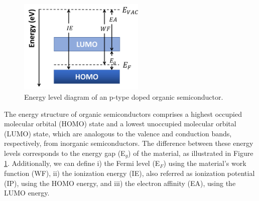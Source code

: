 \begin{figure}[h]
  \centering
  \includegraphics[width=6cm]{Images/pdf/ediagram.pdf}
  \caption[Energy level diagram of organic semiconductors]{Energy level diagram of an p-type doped organic semiconductor.}
  \label{fig:ediag}
\end{figure}

The energy structure of organic semiconductors comprises a highest occupied molecular orbital (HOMO) state and a lowest unoccupied molecular orbital (LUMO) state, which are analogous to the valence and conduction bands, respectively, from inorganic semiconductors. The difference between these energy levels corresponds to the energy gap (E$_{g}$) of the material, as illustrated in Figure \ref{fig:ediag}. Additionally, we can define i) the Fermi level (E$_{F}$) using the material's work function (WF), ii) the ionization energy (IE), also referred as ionization potential (IP), using the HOMO energy, and iii) the electron affinity (EA), using the LUMO energy.



